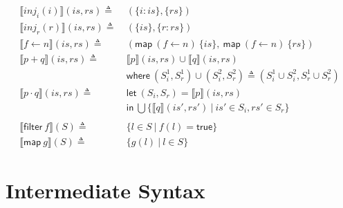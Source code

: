 \documentclass[12pt, letterpaper]{article}
\newcommand\interp[1]{\llbracket #1 \rrbracket}
\begin{document}
\begin{align*}
      \\
    \interp { inj_{i}(i) }(\mathit{is}, \mathit{rs})
      \triangleq\ &
      (\{\mathit{i : is}\}, \{\mathit{rs}\}) 
      \\
    \interp { inj_{r}(r) }(\mathit{is}, \mathit{rs})
      \triangleq\ &
      (\{\mathit{is}\},\{ \mathit{r : rs}\})
      \\
    \interp { f \leftarrow n }(is, rs)
      \triangleq\ &
      (\mathsf{map}\ (f\leftarrow n)\ \{is\},\
       \mathsf{map}\ (f\leftarrow n)\ \{rs\})
      \\ %
    \interp { p + q }(\mathit{is}, \mathit{rs})
      \triangleq\ &
      \interp { p }(\mathit{is}, \mathit{rs})\cup
      \interp { q }(\mathit{is}, \mathit{rs}) \\
      &\mathsf{where}\ (S_i^1, S_r^1)\cup (S_i^2, S_r^2)\triangleq
        (S_i^1\cup S_i^2, S_r^1\cup S_r^2)\\
    \interp { p \cdot q }(\mathit{is}, \mathit{rs})
      \triangleq\ &
      \mathsf{let}\ (S_i, S_r) = \interp{p}(is, rs)\\
      &\mathsf{in}\ \bigcup \{\interp{q}(\mathit{is}',\mathit{rs}')\ |\ \mathit{is}'\in S_i, \mathit{rs'}\in S_r\}\\
      \\
    \interp{\mathsf{filter}\ f}(S)
      \triangleq\ & \{l \in S\ |\ f(l) = \mathsf{true}\}\\
    \interp{\mathsf{map}\ g}(S)
      \triangleq\ &
      \{ g(l)\ |\ l\in S \} 
  \end{align*}


\cleardoublepage
\section{Intermediate Syntax}
\end{document}
